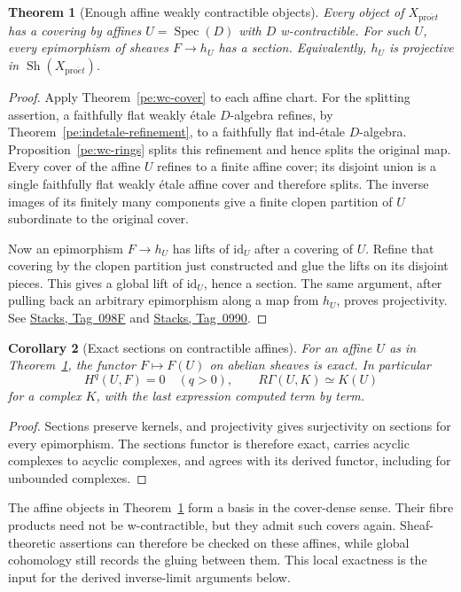 \documentclass[11pt,a4paper]{article}
\numberwithin{equation}{section}
\newtheorem{theorem}{Theorem}[section]
\newtheorem{corollary}[theorem]{Corollary}
\theoremstyle{definition}
\theoremstyle{remark}
\newcommand{\Sh}{\operatorname{Sh}}
\newcommand{\proet}{\mathrm{pro}\acute{e}t}
\newcommand{\stacks}[1]{\href{https://stacks.math.columbia.edu/tag/#1}{\textnormal{Stacks, Tag~#1}}}
\begin{document}
\begin{theorem}[Enough affine weakly contractible objects]
\label{pe:weakly-contractible-basis}
Every object of $X_{\proet}$ has a covering by affines
$U=\operatorname{Spec}(D)$ with $D$ w-contractible. For such $U$,
every epimorphism of sheaves $F\to h_U$ has a section. Equivalently,
$h_U$ is projective in $\Sh(X_{\proet})$.
\end{theorem}
\begin{proof}
Apply Theorem~\ref{pe:wc-cover} to each affine chart. For the
splitting assertion, a faithfully flat weakly \'etale $D$-algebra
refines, by Theorem~\ref{pe:indetale-refinement}, to a faithfully flat
ind-\'etale $D$-algebra. Proposition~\ref{pe:wc-rings} splits this
refinement and hence splits the original map. Every cover of the affine
$U$ refines to a finite affine cover; its disjoint union is a single
faithfully flat weakly \'etale affine cover and therefore splits. The
inverse images of its finitely many components give a finite clopen
partition of $U$ subordinate to the original cover.

Now an epimorphism $F\to h_U$ has lifts of $\mathrm{id}_U$ after
a covering of $U$. Refine that covering by the clopen partition just
constructed and glue the lifts on its disjoint pieces. This gives a
global lift of $\mathrm{id}_U$, hence a section. The same argument,
after pulling back an arbitrary epimorphism along a map from $h_U$,
proves projectivity. See \stacks{098F} and \stacks{0990}.
\end{proof}

\begin{corollary}[Exact sections on contractible affines]
\label{pe:wc-sections}
For an affine $U$ as in Theorem~\ref{pe:weakly-contractible-basis},
the functor $F\mapsto F(U)$ on abelian sheaves is exact. In particular
\[
 H^q(U,F)=0\quad(q>0),\qquad
 R\Gamma(U,K)\simeq K(U)
\]
for a complex $K$, with the last expression computed term by term.
\end{corollary}
\begin{proof}
Sections preserve kernels, and projectivity gives surjectivity on
sections for every epimorphism. The sections functor is therefore
exact, carries acyclic complexes to acyclic complexes, and agrees
with its derived functor, including for unbounded complexes.
\end{proof}

The affine objects in Theorem~\ref{pe:weakly-contractible-basis} form
a basis in the cover-dense sense. Their fibre products need not be
w-contractible, but they admit such covers again. Sheaf-theoretic
assertions can therefore be checked on these affines, while global
cohomology still records the gluing between them. This local exactness
is the input for the derived inverse-limit arguments below.
\end{document}
